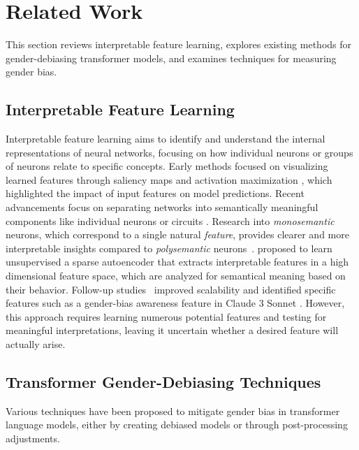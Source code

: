 \section{Related Work}
\label{sec:rel-work}
This section reviews interpretable feature learning, explores existing methods for gender-debiasing transformer models, and examines techniques for measuring gender bias.

\subsection{Interpretable Feature Learning}

Interpretable feature learning aims to identify and understand the internal representations of neural networks, focusing on how individual neurons or groups of neurons relate to specific concepts.
Early methods focused on visualizing learned features through saliency maps \cite{saliencyMaps} and activation maximization \cite{actMax}, which highlighted the impact of input features on model predictions.
Recent advancements focus on separating networks into semantically meaningful components like individual neurons or circuits \cite{introCircuit}.
Research into \emph{monosemantic} neurons, which correspond to a single natural \emph{feature}, provides clearer and more interpretable insights compared to \emph{polysemantic} neurons~\cite{jermyn2022engineeringmonosemanticitytoymodels}.
\citet{bricken2023monosemanticity} proposed to learn unsupervised a sparse autoencoder that extracts interpretable features in a high dimensional feature space, which are analyzed for semantical meaning based on their behavior. Follow-up studies~\cite{anthropic} improved scalability and identified  specific features such as a gender-bias awareness feature in Claude 3 Sonnet \cite{anthropic2024claude3}. 
However, this approach requires learning numerous potential features and testing for meaningful interpretations, leaving it uncertain whether a desired feature will actually arise.


\subsection{Transformer Gender-Debiasing Techniques}\label{sec:rel-work-debiasing}

Various techniques have been proposed to mitigate gender bias in transformer language models, either by creating debiased models or through post-processing adjustments.

